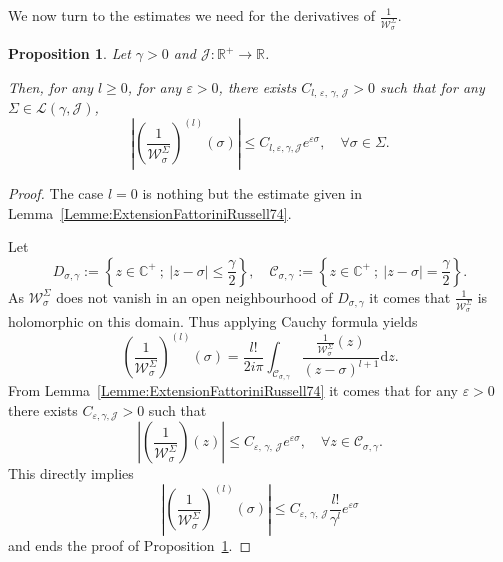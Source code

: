\documentclass[11pt]{article}
\newtheorem{prop}[theo]{Proposition}
\theoremstyle{definition}
\numberwithin{equation}{section}
\numberwithin{figure}{section}
\numberwithin{table}{section}
\newcommand{\R}{\mathbb{R}}
\newcommand{\C}{\mathbb{C}}
\newcommand{\md}{\mathrm{d}}
\let\oldforall\forall
\renewcommand*{\forall}{\mathrel{\oldforall}}
\begin{document}
We now turn to the estimates we need for the derivatives of $\frac{1}{\mathcal{W}^{\Sigma}_{\sigma}}$.

\begin{prop}\label{Prop:WsigSig}
Let $\gamma >0$ and $\mathcal{J} : \R^+ \to \R$.

Then, for any $l \geq 0$, for any $\varepsilon >0$, there exists $C_{l,\,\varepsilon,\,\gamma,\,\mathcal{J}}>0$ such that for any $\Sigma \in \mathcal{L}(\gamma, \mathcal{J})$,
\[
\left| \left(\frac{1}{\mathcal{W}^\Sigma_{\sigma}} \right)^{(l)} (\sigma) \right| \leq C_{l,\varepsilon, \gamma, \mathcal{J}} e^{\varepsilon \sigma}, \quad \forall \sigma \in \Sigma.
\]
\end{prop}

\begin{proof}
The case $l=0$ is nothing but the estimate given in Lemma~\ref{Lemme:ExtensionFattoriniRussell74}.

Let
\[
D_{\sigma,\gamma} := \left\{ z \in \C^+ \: ; \: |z-\sigma| \leq \frac{\gamma}{2} \right\},
\quad
\mathcal{C}_{\sigma,\gamma} := \left\{ z \in \C^+ \: ; \: |z-\sigma| = \frac{\gamma}{2} \right\}.
\]
As $\mathcal{W}^{\Sigma}_\sigma$ does not vanish in an open neighbourhood of $D_{\sigma, \gamma}$ it comes that $\frac{1}{\mathcal{W}^{\Sigma}_\sigma}$ is holomorphic on this domain. Thus applying Cauchy formula yields
\[
\left(\frac{1}{\mathcal{W}^\Sigma_\sigma} \right)^{(l)} (\sigma) = \frac{l!}{2i\pi} \int_{\mathcal{C}_{\sigma,\gamma}} \frac{\frac{1}{\mathcal{W}^\Sigma_\sigma}(z)}{(z-\sigma)^{l+1}} \md z.
\]
From Lemma~\ref{Lemme:ExtensionFattoriniRussell74} it comes that for any $\varepsilon>0$ there exists $C_{\varepsilon, \gamma, \mathcal{J}}>0$ such that
\[
\left| \left(\frac{1}{\mathcal{W}^\Sigma_\sigma} \right)(z) \right| \leq C_{\varepsilon,\,\gamma,\,\mathcal{J}} e^{\varepsilon \sigma}, \quad\forall z\in \mathcal{C}_{\sigma,\gamma}.
\]
This directly implies
\[
\left| \left(\frac{1}{\mathcal{W}^\Sigma_\sigma} \right)^{(l)}(\sigma) \right| \leq C_{\varepsilon,\,\gamma,\,\mathcal{J}} \frac{l!}{\gamma^l} e^{\varepsilon \sigma}
\]
and ends the proof of Proposition~\ref{Prop:WsigSig}.
\end{proof}
\end{document}
